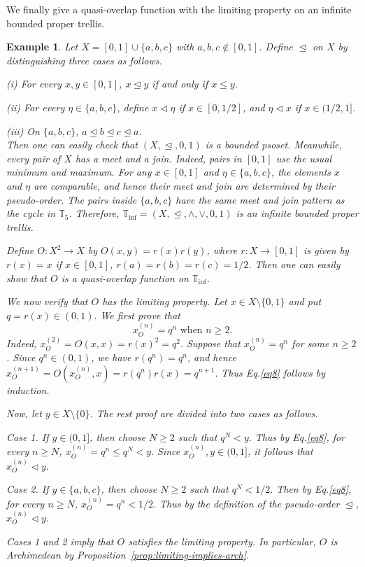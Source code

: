 \documentclass[preprint,12pt]{elsarticle}
\newtheorem{example}[theorem]{Example}
\begin{document}
We finally give a quasi-overlap function with the limiting property on an infinite bounded proper trellis.

\begin{example}\label{ex:infinite-archimedean}
\upshape
Let $X=[0,1]\cup\{a,b,c\}$ with $a,b,c\notin[0,1]$. Define $\trianglelefteq$ on $X$ by distinguishing three cases as follows.

(i) For every $x,y\in[0,1]$, $x \trianglelefteq y$ if and only if $x\leq y$.

(ii) For every $\eta\in\{a,b,c\}$, define
$x\triangleleft \eta$ if $x\in[0,1/2]$, and $\eta\triangleleft x$ if $x\in(1/2,1]$.

(iii) On $\{a,b,c\}$, $a\trianglelefteq b\trianglelefteq c\trianglelefteq a$.\\
Then one can easily check that $(X, \trianglelefteq, 0,1)$ is a bounded psoset. Meanwhile, every pair of $X$ has a meet and a join. Indeed, pairs in $[0,1]$ use the usual minimum and maximum. For any $x\in[0,1]$ and $\eta\in\{a,b,c\}$, the elements $x$ and $\eta$ are comparable, and hence their meet and join are determined by their pseudo-order. The pairs inside $\{a,b,c\}$ have the same meet and join pattern as the cycle in $\mathbb{T}_5$. Therefore, $\mathbb{T}_{\mathrm{inf}}=(X, \trianglelefteq, \wedge, \vee, 0,1)$ is an infinite bounded proper trellis.

Define $O:X^2\to X$ by
$O(x,y)=r(x)r(y)$, where $r:X\to[0,1]$ is given by
$r(x)=x$ if $x\in[0,1]$,
$r(a)=r(b)=r(c)=1/2$.
Then one can easily show that $O$ is a quasi-overlap function on $\mathbb{T}_{\mathrm{inf}}$.

We now verify that $O$ has the limiting property. Let $x\in X\setminus\{0,1\}$ and put
$
q=r(x)\in(0,1).
$
We first prove that
\begin{equation}\label{eq8}x_O^{(n)}=q^n\mbox{ when }n\ge2.\end{equation} Indeed,
$
x_O^{(2)}=O(x,x)=r(x)^2=q^2.
$
Suppose that $x_O^{(n)}=q^n$ for some $n\ge2$. Since $q^n\in(0,1)$, we have $r(q^n)=q^n$, and hence
$
x_O^{(n+1)}
=O(x_O^{(n)},x)
=r(q^n)r(x)
=q^{n+1}.
$
Thus Eq.\eqref{eq8} follows by induction.

Now, let $y\in X\setminus\{0\}$. The rest proof are divided into two cases as follows.

Case 1. If $y\in(0,1]$, then choose $N\ge2$ such that
$
q^N<y.
$
Thus by Eq.\eqref{eq8}, for every $n\ge N$,
$
x_O^{(n)}=q^n\le q^N<y.
$
Since $x_O^{(n)},y\in(0,1]$, it follows that
$
x_O^{(n)}\triangleleft y.
$

 Case 2. If $y\in\{a,b,c\}$, then choose $N\ge2$ such that
$
q^N<1/2.
$
Then by Eq.\eqref{eq8}, for every $n\ge N$,
$
x_O^{(n)}=q^n<1/2.
$
Thus by the definition of the pseudo-order $\trianglelefteq$,
$
x_O^{(n)}\triangleleft y.
$

Cases 1 and 2 imply that $O$ satisfies the limiting property. In particular, $O$ is Archimedean by Proposition~\ref{prop:limiting-implies-arch}.
\end{example}
\end{document}
